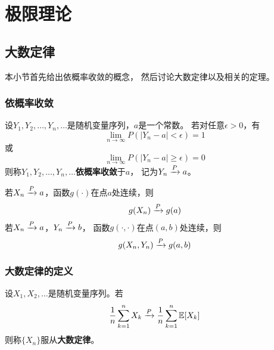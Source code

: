\chapter{极限理论}

\section{大数定律}
本小节首先给出依概率收敛的概念，
然后讨论大数定律以及相关的定理。

\subsection{依概率收敛}
\begin{definition}[依概率收敛]
  设$Y_1,Y_2,\dots,Y_n,\dots$是随机变量序列，$a$是一个常数。
  若对任意$\epsilon >0$，有
  \begin{displaymath}
    \lim_{n\to\infty}P(|Y_n - a|<\epsilon) = 1
  \end{displaymath}
  或
  \begin{displaymath}
    \lim_{n\to\infty}P(|Y_n-a|\ge\epsilon) = 0
  \end{displaymath}
  则称$Y_1,Y_2,\dots,Y_n,\dots$\textbf{依概率收敛}于$a$，
  记为$Y_n \xrightarrow{P} a$。
\end{definition}

\begin{theorem}[连续映射定理]
  若$X_n\xrightarrow{P} a$，函数$g(\cdot)$在点$a$处连续，则
  \begin{displaymath}
    g(X_n) \xrightarrow{P} g(a)
  \end{displaymath}
  若$X_n\xrightarrow{P} a$，$Y_n\xrightarrow{P} b$，
  函数$g(\cdot,\cdot)$在点$(a,b)$处连续，则
  \begin{displaymath}
    g(X_n,Y_n) \xrightarrow{P} g(a,b)
  \end{displaymath}
\end{theorem}

\subsection{大数定律的定义}
\begin{definition}[大数定律]
  设$X_1,X_2,\dots$是随机变量序列。若
  \begin{displaymath}
    \frac{1}{n}\sum_{k=1}^{n}X_k \xrightarrow{P}
      \frac{1}{n}\sum_{k=1}^{n}\mathbb{E}[X_k]
  \end{displaymath}
  则称$\{X_n\}$服从\textbf{大数定律}。
\end{definition}

